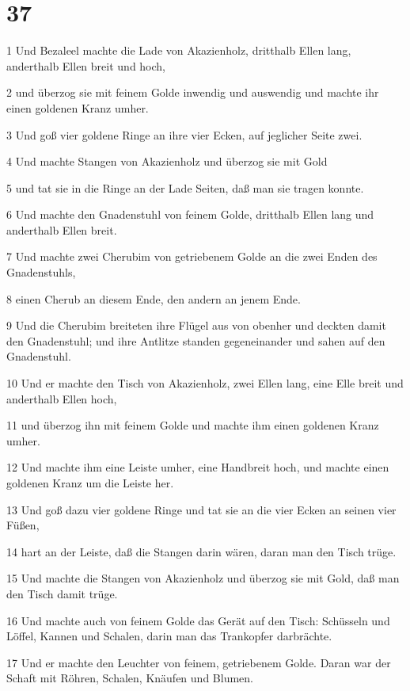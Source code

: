 \chapter{37}

\par 1 Und Bezaleel machte die Lade von Akazienholz, dritthalb Ellen lang, anderthalb Ellen breit und hoch,
\par 2 und überzog sie mit feinem Golde inwendig und auswendig und machte ihr einen goldenen Kranz umher.
\par 3 Und goß vier goldene Ringe an ihre vier Ecken, auf jeglicher Seite zwei.
\par 4 Und machte Stangen von Akazienholz und überzog sie mit Gold
\par 5 und tat sie in die Ringe an der Lade Seiten, daß man sie tragen konnte.
\par 6 Und machte den Gnadenstuhl von feinem Golde, dritthalb Ellen lang und anderthalb Ellen breit.
\par 7 Und machte zwei Cherubim von getriebenem Golde an die zwei Enden des Gnadenstuhls,
\par 8 einen Cherub an diesem Ende, den andern an jenem Ende.
\par 9 Und die Cherubim breiteten ihre Flügel aus von obenher und deckten damit den Gnadenstuhl; und ihre Antlitze standen gegeneinander und sahen auf den Gnadenstuhl.
\par 10 Und er machte den Tisch von Akazienholz, zwei Ellen lang, eine Elle breit und anderthalb Ellen hoch,
\par 11 und überzog ihn mit feinem Golde und machte ihm einen goldenen Kranz umher.
\par 12 Und machte ihm eine Leiste umher, eine Handbreit hoch, und machte einen goldenen Kranz um die Leiste her.
\par 13 Und goß dazu vier goldene Ringe und tat sie an die vier Ecken an seinen vier Füßen,
\par 14 hart an der Leiste, daß die Stangen darin wären, daran man den Tisch trüge.
\par 15 Und machte die Stangen von Akazienholz und überzog sie mit Gold, daß man den Tisch damit trüge.
\par 16 Und machte auch von feinem Golde das Gerät auf den Tisch: Schüsseln und Löffel, Kannen und Schalen, darin man das Trankopfer darbrächte.
\par 17 Und er machte den Leuchter von feinem, getriebenem Golde. Daran war der Schaft mit Röhren, Schalen, Knäufen und Blumen.
